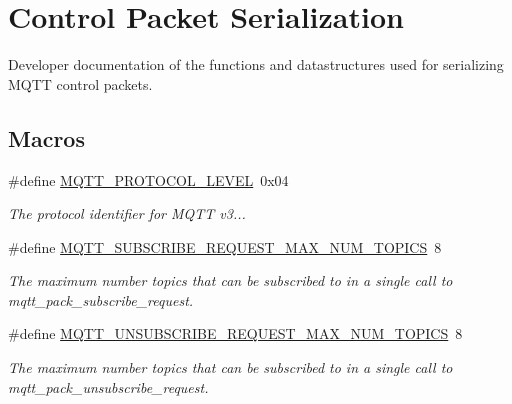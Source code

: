 \hypertarget{group__packers}{}\section{Control Packet Serialization}
\label{group__packers}


Developer documentation of the functions and datastructures used for serializing M\+Q\+TT control packets.  


\subsection*{Macros}
\begin{DoxyCompactItemize}
\item 
\#define \hyperlink{group__packers_ga50781ed232e8fd19a071d07566579974}{M\+Q\+T\+T\+\_\+\+P\+R\+O\+T\+O\+C\+O\+L\+\_\+\+L\+E\+V\+EL}~0x04
\begin{DoxyCompactList}\small\item\em The protocol identifier for M\+Q\+TT v3... \end{DoxyCompactList}\item 
\#define \hyperlink{group__packers_ga6501874871fce6b65d972430afa64fb8}{M\+Q\+T\+T\+\_\+\+S\+U\+B\+S\+C\+R\+I\+B\+E\+\_\+\+R\+E\+Q\+U\+E\+S\+T\+\_\+\+M\+A\+X\+\_\+\+N\+U\+M\+\_\+\+T\+O\+P\+I\+CS}~8
\begin{DoxyCompactList}\small\item\em The maximum number topics that can be subscribed to in a single call to mqtt\+\_\+pack\+\_\+subscribe\+\_\+request. \end{DoxyCompactList}\item 
\#define \hyperlink{group__packers_gaff4017b7a1668b6ad6e0d006d0fdf10e}{M\+Q\+T\+T\+\_\+\+U\+N\+S\+U\+B\+S\+C\+R\+I\+B\+E\+\_\+\+R\+E\+Q\+U\+E\+S\+T\+\_\+\+M\+A\+X\+\_\+\+N\+U\+M\+\_\+\+T\+O\+P\+I\+CS}~8
\begin{DoxyCompactList}\small\item\em The maximum number topics that can be subscribed to in a single call to mqtt\+\_\+pack\+\_\+unsubscribe\+\_\+request. \end{DoxyCompactList}\end{DoxyCompactItemize}
